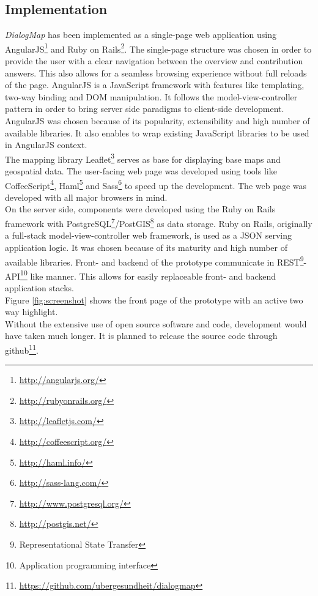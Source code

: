 \documentclass{sigchi}
\begin{document}
\subsection{Implementation}
\textit{DialogMap} has been implemented as a single-page web application using AngularJS\footnote{\url{http://angularjs.org/}} and Ruby on Rails\footnote{\url{http://rubyonrails.org/}}. The single-page structure was chosen in order to provide the user with a clear navigation between the overview and contribution answers. This also allows for a seamless browsing experience without full reloads of the page. AngularJS is a JavaScript framework with features like templating, two-way binding and DOM manipulation. It follows the model-view-controller pattern in order to bring server side paradigms to client-side development. AngularJS was chosen because of its popularity, extensibility and high number of available libraries. It also enables to wrap existing JavaScript libraries to be used in AngularJS context.\\
The mapping library Leaflet\footnote{\url{http://leafletjs.com/}} serves as base for displaying base maps and geospatial data. The user-facing web page was developed using tools like CoffeeScript\footnote{\url{http://coffeescript.org/}}, Haml\footnote{\url{http://haml.info/}} and Sass\footnote{\url{http://sass-lang.com/}} to speed up the development. The web page was developed with all major browsers in mind.\\
On the server side, components were developed using the Ruby on Rails framework with PostgreSQL\footnote{\url{http://www.postgresql.org/}}/PostGIS\footnote{\url{http://postgis.net/}} as data storage. Ruby on Rails, originally a full-stack model-view-controller web framework, is used as a JSON serving application logic. It was chosen because of its maturity and high number of available libraries. Front- and backend of the prototype communicate in REST\footnote{Representational State Transfer}-API\footnote{Application programming interface} like manner. This allows for easily replaceable front- and backend application stacks.\\
Figure \ref{fig:screenshot} shows the front page of the prototype with an active two way highlight.\\
Without the extensive use of open source software and code, development would have taken much longer. It is planned to release the source code through github\footnote{\url{https://github.com/ubergesundheit/dialogmap}}.
\end{document}
